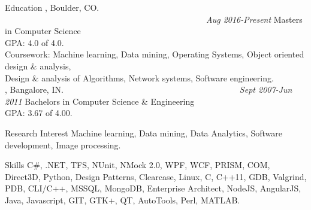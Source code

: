 \documentclass{resume}
\author{~~~~~~Sunil BN}
\begin{document}
\maketitle


\begin{category}{Education}
, Boulder, CO. ~~~~~~~~~~~~~~~~~~~~~~~~~~~~~~~~~~~~~~~~~~~~~~~~\textit{Aug 2016-Present}
Masters in Computer Science\\
GPA: 4.0 of 4.0.\\
Coursework: Machine learning, Data mining, Operating Systems, Object oriented design \& analysis,\\ Design \& analysis of Algorithms, Network systems, Software engineering.\\
, Bangalore, IN.~~~~~~~~~~~~~~~~~~~~~~~~~~~~~~~~~~~~~~~~~~\textit{Sept 2007-Jun 2011}
Bachelors in Computer Science \& Engineering\\
GPA: 3.67 of 4.00.
\end{category}


\begin{category}{Research Interest}
\citemnobullet Machine learning, Data mining, Data Analytics, Software development, Image processing.\\
\end{category}

\begin{category}{Skills}
\citemnobullet 
C\#, .NET, TFS, NUnit, NMock 2.0, WPF, WCF, PRISM, COM, Direct3D, Python, Design Patterns, Clearcase, Linux, C, C++11, GDB, Valgrind, PDB, CLI/C++, MSSQL, MongoDB, Enterprise Architect, NodeJS, AngularJS, Java, Javascript, GIT, GTK+, QT, AutoTools, Perl, MATLAB. 
\end{category}
\end{document}
